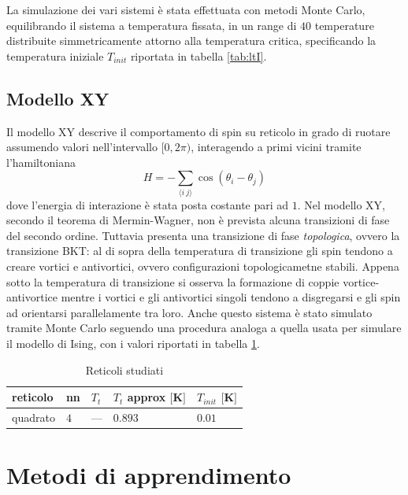 \documentclass{article}
\begin{document}
La simulazione dei vari sistemi è stata effettuata con metodi Monte Carlo, equilibrando il sistema a temperatura fissata, in un range di $40$ temperature distribuite simmetricamente attorno alla temperatura critica, specificando la temperatura iniziale $T_{init}$ riportata in tabella \ref{tab:ltI}.
\subsection{Modello XY}
Il modello XY descrive il comportamento di spin su reticolo in grado di ruotare assumendo valori nell'intervallo $[0,2\pi)$, interagendo a primi vicini tramite l'hamiltoniana
\begin{equation}
H=-\sum_{\langle i~j\rangle} \cos(\theta_i-\theta_j)
\end{equation}
dove l'energia di interazione è stata posta costante pari ad $1$. Nel modello XY,  secondo il teorema di Mermin-Wagner, non è prevista alcuna transizioni di fase del secondo ordine. Tuttavia presenta una transizione di fase \emph{topologica}, ovvero la transizione BKT\cite{kosterlitz}: al di sopra della temperatura di transizione gli spin tendono a creare vortici e antivortici, ovvero configurazioni topologicametne stabili.
Appena sotto la temperatura di transizione si osserva la formazione di coppie vortice-antivortice mentre i vortici e gli antivortici singoli tendono a disgregarsi e gli spin ad orientarsi parallelamente tra loro.
Anche questo sistema è stato simulato tramite Monte Carlo seguendo una procedura analoga a quella usata per simulare il modello di Ising, con i valori riportati in tabella \ref{tab:ltXY}.
\begin{table}[h]
\begin{center}
\begin{tabular}{lllll}
\toprule
reticolo & nn & $T_t$ & $T_t$ approx $[$\si{K}$]$ & $T_{init}$ $[$\si{K}$]$\\
\midrule
quadrato & $4$ & --- & $0.893$ & $0.01$\\
\bottomrule
\end{tabular}
\end{center}
\caption{Reticoli studiati}
\label{tab:ltXY}
\end{table}

\section{Metodi di apprendimento}
\end{document}
